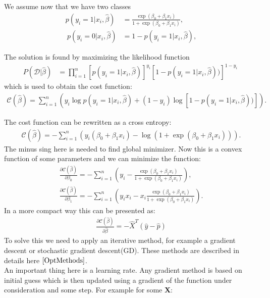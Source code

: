\documentclass[10pt]{article}
\begin{document}
We assume now that we have two classes
 \begin{align} p(y_i=1|x_i,\hat{\beta}) &= \frac{\exp{(\beta_0+\beta_1x_i)}}{1+\exp{(\beta_0+\beta_1x_i)}}, \\\nonumber\ p(y_i=0|x_i,\hat{\beta}) &= 1 - p(y_i=1|x_i,\hat{\beta}), \end{align}

The solution is found by maximizing the likelihood function 
\begin{align} P(\mathcal{D}|\hat{\beta})& = \prod_{i=1}^n \left[p(y_i=1|x_i,\hat{\beta})\right]^{y_i}\left[1-p(y_i=1|x_i,\hat{\beta}))\right]^{1-y_i}\nonumber \ \end{align}
which is used to obtain the  cost function:
\begin{align}
\mathcal{C}(\hat{\beta}) = \sum_{i=1}^n \left( y_i\log{p(y_i=1|x_i,\hat{\beta})} + (1-y_i)\log\left[1-p(y_i=1|x_i,\hat{\beta}))\right]\right).
\end{align}

The cost function can be rewritten as a cross entropy:
\begin{align}
\mathcal{C}(\hat{\beta})=-\sum_{i=1}^n  \left(y_i(\beta_0+\beta_1x_i) -\log{(1+\exp{(\beta_0+\beta_1x_i)})}\right).
\end{align}
The minus sing here is needed to find global minimizer. Now this is a convex function of some parameters and we can minimize the function:
\begin{align}
\frac{\partial \mathcal{C}(\hat{\beta})}{\partial \beta_0} = -\sum_{i=1}^n  \left(y_i -\frac{\exp{(\beta_0+\beta_1x_i)}}{1+\exp{(\beta_0+\beta_1x_i)}}\right),\\
\frac{\partial \mathcal{C}(\hat{\beta})}{\partial \beta_1} = -\sum_{i=1}^n  \left(y_ix_i -x_i\frac{\exp{(\beta_0+\beta_1x_i)}}{1+\exp{(\beta_0+\beta_1x_i)}}\right).
\end{align}
In a more compact way this can be presented as:
\begin{align}\frac{\partial \mathcal{C}(\hat{\beta})}{\partial \hat{\beta}} = -\hat{X}^T\left(\hat{y}-\hat{p}\right)
\end{align}
To solve this we need to apply an iterative method, for example a gradient descent or stochastic gradient descent(GD). These methods are described in details here $\cite{OptMethods}$.\\
An important thing here is a learning rate. Any gradient method is based on initial guess which is then updated using a gradient of the function under consideration and some step. For example for some \textbf{X}:
\end{document}
